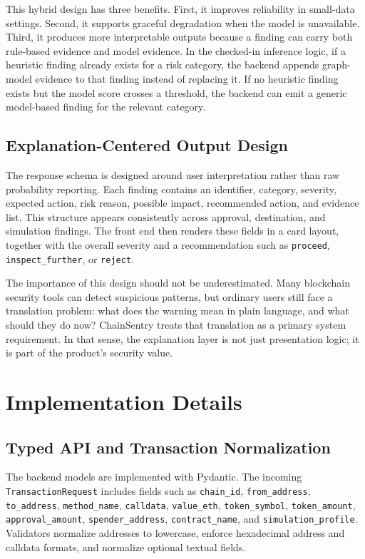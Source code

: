 \documentclass[11pt]{article}
\begin{document}
This hybrid design has three benefits. First, it improves reliability in small-data settings. Second, it supports graceful degradation when the model is unavailable. Third, it produces more interpretable outputs because a finding can carry both rule-based evidence and model evidence. In the checked-in inference logic, if a heuristic finding already exists for a risk category, the backend appends graph-model evidence to that finding instead of replacing it. If no heuristic finding exists but the model score crosses a threshold, the backend can emit a generic model-based finding for the relevant category.

\subsection{Explanation-Centered Output Design}

The response schema is designed around user interpretation rather than raw probability reporting. Each finding contains an identifier, category, severity, expected action, risk reason, possible impact, recommended action, and evidence list. This structure appears consistently across approval, destination, and simulation findings. The front end then renders these fields in a card layout, together with the overall severity and a recommendation such as \texttt{proceed}, \texttt{inspect\_further}, or \texttt{reject}.

The importance of this design should not be underestimated. Many blockchain security tools can detect suspicious patterns, but ordinary users still face a translation problem: what does the warning mean in plain language, and what should they do now? ChainSentry treats that translation as a primary system requirement. In that sense, the explanation layer is not just presentation logic; it is part of the product's security value.

\section{Implementation Details}

\subsection{Typed API and Transaction Normalization}

The backend models are implemented with Pydantic. The incoming \texttt{TransactionRequest} includes fields such as \texttt{chain\_id}, \texttt{from\_address}, \texttt{to\_address}, \texttt{method\_name}, \texttt{calldata}, \texttt{value\_eth}, \texttt{token\_symbol}, \texttt{token\_amount}, \texttt{approval\_amount}, \texttt{spender\_address}, \texttt{contract\_name}, and \texttt{simulation\_profile}. Validators normalize addresses to lowercase, enforce hexadecimal address and calldata formats, and normalize optional textual fields.
\end{document}
